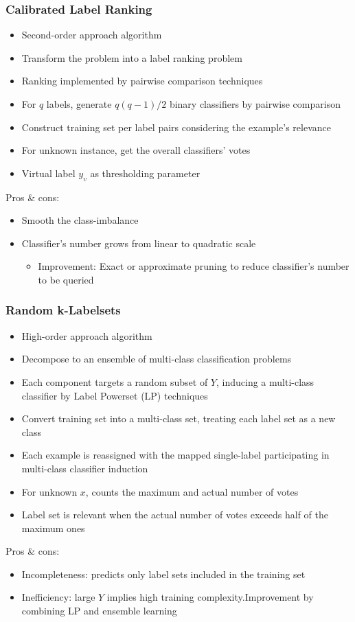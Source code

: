 \documentclass{beamer}
\begin{document}
\begin{frame}
\frametitle{Calibrated Label Ranking}
\begin{itemize}
	\item Second-order approach algorithm
	\item Transform the problem into a label ranking problem
	\item Ranking implemented by pairwise comparison techniques
	\item For $q$ labels, generate $q(q-1)/2$ binary classifiers by pairwise comparison
	\item Construct training set per label pairs considering the example's relevance
	\item For unknown instance, get the overall classifiers' votes
	\item Virtual label $y_v$ as thresholding parameter
\end{itemize}
Pros \& cons:
\begin{itemize}
	\item Smooth the class-imbalance
	\item Classifier's number grows from linear to quadratic scale
	\begin{itemize}
		\item Improvement: Exact or approximate pruning to reduce classifier's number to be queried
	\end{itemize}
\end{itemize}
\end{frame}
\begin{frame}
\frametitle{Random k-Labelsets}
\begin{itemize}
	\item High-order approach algorithm
	\item Decompose to an ensemble of multi-class classification problems
	\item Each component targets a random subset of $Y$, inducing a multi-class classifier by Label Powerset (LP) techniques
	\item Convert training set into a multi-class set, treating each label set as a new class
	\item Each example is reassigned with the mapped single-label participating in multi-class classifier induction
	\item For unknown $x$, counts the maximum and actual number of votes
	\item Label set is relevant when the actual number of votes exceeds
half of the maximum ones
\end{itemize}
Pros \& cons:
\begin{itemize}
	\item Incompleteness: predicts only label sets included in the training set
	\item Inefficiency: large $Y$ implies high training complexity.Improvement by combining LP and ensemble learning
\end{itemize}
\end{frame}
\end{document}
